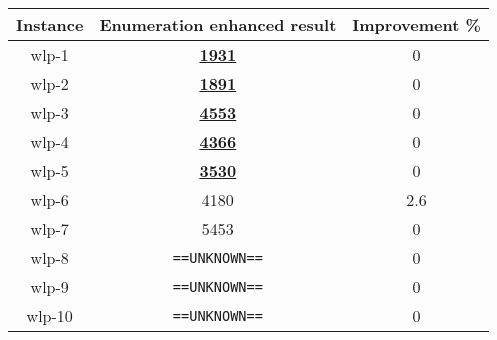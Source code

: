 \documentclass{article}
\newcommand{\UNK}{\texttt{==UNKNOWN==}}
\newcommand{\sol}[1]{#1}
\newcommand{\proved}[1]{\textbf{\underline{#1}}}
\begin{document}
\begin{table}[H]
    \begin{center}
        \begin{tabular}{|c|c|c|}
            \hline
            \textbf{Instance}&\textbf{Enumeration enhanced result} & \textbf{Improvement \%} \\
            \hline
            wlp-1         &   \proved{1931} &   0   \\
            \hline
            wlp-2         &   \proved{1891} &   0   \\
            \hline
            wlp-3         &   \proved{4553} &   0   \\
            \hline
            wlp-4         &   \proved{4366} &   0   \\
            \hline
            wlp-5         &   \proved{3530} &   0   \\
            \hline
            wlp-6         &   \sol{4180}    &  2.6   \\
            \hline
            wlp-7         &   \sol{5453}    &   0   \\
            \hline
            wlp-8         &   \UNK          &   0   \\
            \hline
            wlp-9         &   \UNK          &   0   \\
            \hline
            wlp-10        &   \UNK          &   0   \\
            \hline
        \end{tabular}
    \end{center}
\end{table}
\end{document}
